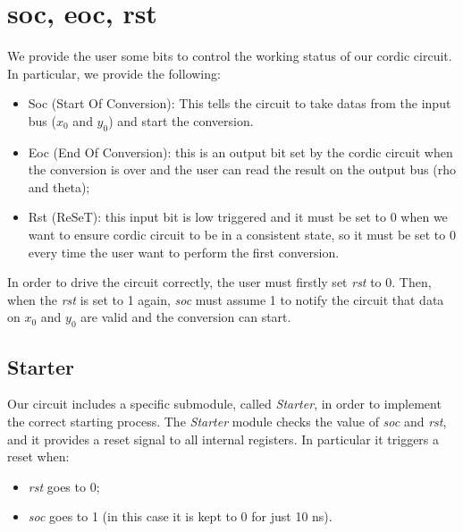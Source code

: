 \documentclass[12pt,a4paper]{report}
\begin{document}
\section{soc, eoc, rst}
We provide the user some bits to control the working status of our cordic circuit. In particular, we provide the following:
\begin{itemize}
	\item Soc (Start Of Conversion): This tells the circuit to take datas from the input bus ($x_{0}$ and $y_0$) and start the conversion.
	\item Eoc (End Of Conversion): this is an output bit set by the cordic circuit when the conversion is over and the user can read the result on the output bus (rho and theta);
	\item Rst (ReSeT): this input bit is low triggered and it must be set to 0 when we want to ensure cordic circuit to be in a consistent state, so it must be set to 0 every time the user want to perform the first conversion.
\end{itemize}

In order to drive the circuit correctly, the user must firstly set \emph{rst} to 0. Then, when the \emph{rst} is set to 1 again, \emph{soc} must assume 1 to notify the circuit that data on $x_0$ and $y_0$ are valid and the conversion can start.

\subsection{Starter}
Our circuit includes a specific submodule, called \emph{Starter}, in order to implement the correct starting process. The \emph{Starter} module checks the value of \emph{soc} and \emph{rst}, and it provides a reset signal to all internal registers. In particular it triggers a reset when:

\begin{itemize}
	\item \emph{rst} goes to 0;
	\item \emph{soc} goes to 1 (in this case it is kept to 0 for just 10 ns).
\end{itemize}
\end{document}
